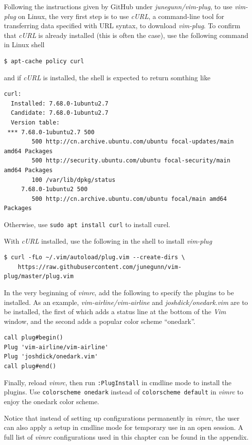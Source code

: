 Following the instructions given by GitHub under \textit{junegunn/vim-plug}, to use \textit{vim-plug} on Linux, the very first step is to use \textit{cURL}, a command-line tool for transferring data specified with URL syntax, to download \textit{vim-plug}. To confirm that \textit{cURL} is already installed (this is often the case), use the following command in Linux shell
\begin{lstlisting}
$ apt-cache policy curl
\end{lstlisting}
and if \textit{cURL} is installed, the shell is expected to return somthing like
\begin{lstlisting}
curl:
  Installed: 7.68.0-1ubuntu2.7
  Candidate: 7.68.0-1ubuntu2.7
  Version table:
 *** 7.68.0-1ubuntu2.7 500
        500 http://cn.archive.ubuntu.com/ubuntu focal-updates/main amd64 Packages
        500 http://security.ubuntu.com/ubuntu focal-security/main amd64 Packages
        100 /var/lib/dpkg/status
     7.68.0-1ubuntu2 500
        500 http://cn.archive.ubuntu.com/ubuntu focal/main amd64 Packages
\end{lstlisting}
Otherwise, use \verb|sudo apt install curl| to install curel.


With \textit{cURL} installed, use the following in the shell to install \textit{vim-plug}
\begin{lstlisting}
$ curl -fLo ~/.vim/autoload/plug.vim --create-dirs \
    https://raw.githubusercontent.com/junegunn/vim-plug/master/plug.vim
\end{lstlisting}

In the very beginning of \textit{vimrc}, add the following to specify the plugins to be installed. As an example, \textit{vim-airline/vim-airline} and \textit{joshdick/onedark.vim} are to be installed, the first of which adds a status line at the bottom of the \textit{Vim} window, and the second adds a popular color scheme ``onedark''.
\begin{lstlisting}
call plug#begin()
Plug 'vim-airline/vim-airline'
Plug 'joshdick/onedark.vim'
call plug#end()
\end{lstlisting}

Finally, reload \textit{vimrc}, then run \verb|:PlugInstall| in cmdline mode to install the plugins. Use \verb|colorscheme onedark| instead of \verb|colorscheme default| in \textit{vimrc} to enjoy the onedark color scheme.

Notice that instead of setting up configurations permanently in \textit{vimrc}, the user can also apply a setup in cmdline mode for temporary use in an open session. A full list of \textit{vimrc} configurations used in this chapter can be found in the appendix.

